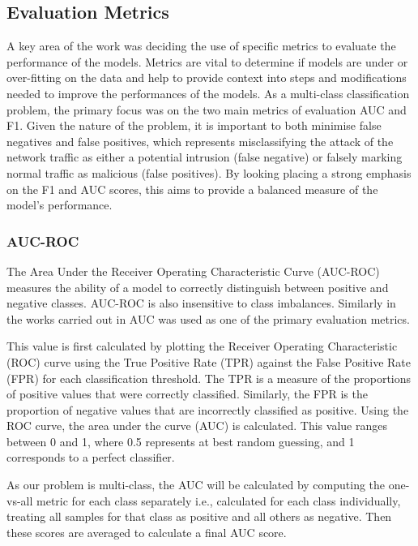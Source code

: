 \subsection{Evaluation Metrics}

A key area of the work was deciding the use of specific metrics to evaluate the performance of the models. Metrics are vital to determine if models are under or over-fitting on the data and help to provide context into steps and modifications needed to improve the performances of the models. 
As a multi-class classification problem, the primary focus was on the two main metrics of evaluation AUC and F1. Given the nature of the problem, it is important to both minimise false negatives and false positives, which represents misclassifying the attack of the network traffic as either a potential intrusion (false negative) or falsely marking normal traffic as malicious (false positives). By looking placing a strong emphasis on the F1 and AUC scores, this aims to provide a balanced measure of the model's performance.


\subsubsection*{AUC-ROC}

The Area Under the Receiver Operating Characteristic Curve (AUC-ROC) measures the ability of a model to correctly distinguish between positive and negative classes. AUC-ROC is also insensitive to class imbalances. Similarly in the works carried out in \parencite{s22155633, pick_quality_over} AUC was used as one of the primary evaluation metrics.

\medskip

This value is first calculated by plotting the Receiver Operating Characteristic (ROC) curve using the True Positive Rate (TPR) against the False Positive Rate (FPR) for each classification threshold. The TPR is a measure of the proportions of positive values that were correctly classified. Similarly, the FPR is the proportion of negative values that are incorrectly classified as positive. Using the ROC curve, the area under the curve (AUC) is calculated. This value ranges between 0 and 1, where 0.5 represents at best random guessing, and 1 corresponds to a perfect classifier.

\medskip

As our problem is multi-class, the AUC will be calculated by computing the one-vs-all metric for each class separately i.e.,  calculated for each class individually, treating all samples for that class as positive and all others as negative. Then these scores are averaged to calculate a final AUC score.


